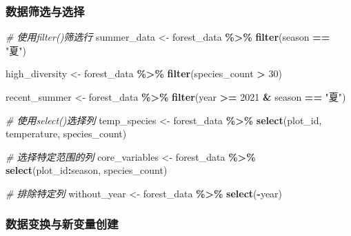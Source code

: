 \documentclass[
  twoside]{book}
\newenvironment{Shaded}{\begin{snugshade}}{\end{snugshade}}
\newcommand{\CommentTok}[1]{\textcolor[rgb]{0.56,0.35,0.01}{\textit{#1}}}
\newcommand{\DecValTok}[1]{\textcolor[rgb]{0.00,0.00,0.81}{#1}}
\newcommand{\FunctionTok}[1]{\textcolor[rgb]{0.13,0.29,0.53}{\textbf{#1}}}
\newcommand{\NormalTok}[1]{#1}
\newcommand{\OtherTok}[1]{\textcolor[rgb]{0.56,0.35,0.01}{#1}}
\newcommand{\SpecialCharTok}[1]{\textcolor[rgb]{0.81,0.36,0.00}{\textbf{#1}}}
\newcommand{\StringTok}[1]{\textcolor[rgb]{0.31,0.60,0.02}{#1}}
\begin{document}
\hypertarget{ux6570ux636eux7b5bux9009ux4e0eux9009ux62e9}{%
\subsubsection{数据筛选与选择}\label{ux6570ux636eux7b5bux9009ux4e0eux9009ux62e9}}

\begin{Shaded}
\begin{Highlighting}[]
\CommentTok{\# 使用filter()筛选行}
\NormalTok{summer\_data }\OtherTok{\textless{}{-}}\NormalTok{ forest\_data }\SpecialCharTok{\%\textgreater{}\%}
  \FunctionTok{filter}\NormalTok{(season }\SpecialCharTok{==} \StringTok{"夏"}\NormalTok{)}

\NormalTok{high\_diversity }\OtherTok{\textless{}{-}}\NormalTok{ forest\_data }\SpecialCharTok{\%\textgreater{}\%}
  \FunctionTok{filter}\NormalTok{(species\_count }\SpecialCharTok{\textgreater{}} \DecValTok{30}\NormalTok{)}

\NormalTok{recent\_summer }\OtherTok{\textless{}{-}}\NormalTok{ forest\_data }\SpecialCharTok{\%\textgreater{}\%}
  \FunctionTok{filter}\NormalTok{(year }\SpecialCharTok{\textgreater{}=} \DecValTok{2021} \SpecialCharTok{\&}\NormalTok{ season }\SpecialCharTok{==} \StringTok{"夏"}\NormalTok{)}

\CommentTok{\# 使用select()选择列}
\NormalTok{temp\_species }\OtherTok{\textless{}{-}}\NormalTok{ forest\_data }\SpecialCharTok{\%\textgreater{}\%}
  \FunctionTok{select}\NormalTok{(plot\_id, temperature, species\_count)}

\CommentTok{\# 选择特定范围的列}
\NormalTok{core\_variables }\OtherTok{\textless{}{-}}\NormalTok{ forest\_data }\SpecialCharTok{\%\textgreater{}\%}
  \FunctionTok{select}\NormalTok{(plot\_id}\SpecialCharTok{:}\NormalTok{season, species\_count)}

\CommentTok{\# 排除特定列}
\NormalTok{without\_year }\OtherTok{\textless{}{-}}\NormalTok{ forest\_data }\SpecialCharTok{\%\textgreater{}\%}
  \FunctionTok{select}\NormalTok{(}\SpecialCharTok{{-}}\NormalTok{year)}
\end{Highlighting}
\end{Shaded}

\hypertarget{ux6570ux636eux53d8ux6362ux4e0eux65b0ux53d8ux91cfux521bux5efa}{%
\subsubsection{数据变换与新变量创建}\label{ux6570ux636eux53d8ux6362ux4e0eux65b0ux53d8ux91cfux521bux5efa}}
\end{document}

